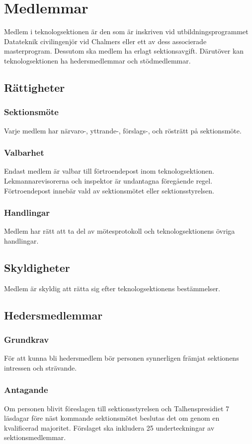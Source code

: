 \section{Medlemmar}
\label{sec:medlemmar}
Medlem i teknologsektionen är den som är inskriven vid utbildningsprogrammet Datateknik civilingenjör vid Chalmers eller ett av dess associerade masterprogram. Dessutom ska medlem ha erlagt sektionsavgift. Därutöver kan teknologsektionen ha hedersmedlemmar och stödmedlemmar.
\subsection{Rättigheter}
\subsubsection{Sektionsmöte}
Varje medlem har närvaro-, yttrande-, förslags-, och rösträtt på sektionsmöte.
\subsubsection{Valbarhet}
\label{sec:medlemmar_valbarhet}
Endast medlem är valbar till förtroendepost inom teknologsektionen. Lekmannarevisorerna och inspektor är undantagna föregående regel. Förtroendepost innebär vald av sektionsmötet eller sektionsstyrelsen.
\subsubsection{Handlingar}
Medlem har rätt att ta del av mötesprotokoll och teknologsektionens övriga handlingar.
\subsection{Skyldigheter}
Medlem är skyldig att rätta sig efter teknologsektionens bestämmelser.
\subsection{Hedersmedlemmar}
\subsubsection{Grundkrav}
För att kunna bli hedersmedlem bör personen synnerligen främjat sektionens intressen och strävande.
\subsubsection{Antagande}
Om personen blivit föreslagen till sektionsstyrelsen och Talhenspresidiet 7 läsdagar före näst kommande sektionsmötet beslutas det om genom en kvalificerad majoritet.
Förslaget ska inkludera 25 underteckningar av sektionsmedlemmar.
